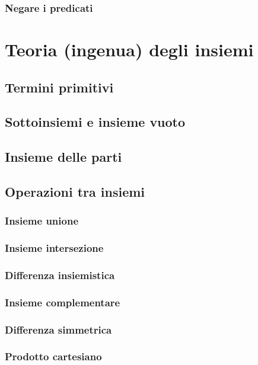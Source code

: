 \documentclass{article}
\begin{document}
\subsubsection{Negare i predicati}

\section{Teoria (ingenua) degli insiemi}

\subsection{Termini primitivi}

\subsection{Sottoinsiemi e insieme vuoto}

\subsection{Insieme delle parti}

\subsection{Operazioni tra insiemi}
\subsubsection{Insieme unione}
\subsubsection{Insieme intersezione}
\subsubsection{Differenza insiemistica}
\subsubsection{Insieme complementare}
\subsubsection{Differenza simmetrica}
\subsubsection{Prodotto cartesiano}
\end{document}
